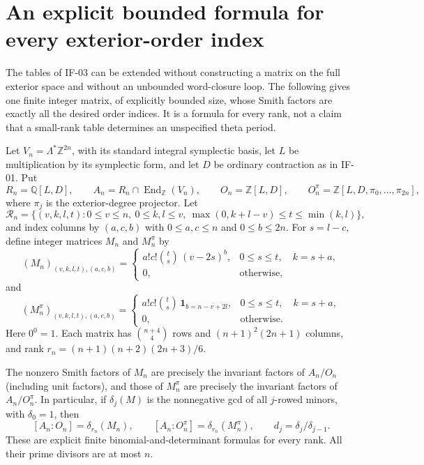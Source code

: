 \section{An explicit bounded formula for every exterior-order index}
\label{sec:bounded-indices}

The tables of IF-03 can be extended without constructing a matrix on
the full exterior space and without an unbounded word-closure loop.
The following gives one finite integer matrix, of explicitly bounded
size, whose Smith factors are exactly all the desired order indices.
It is a formula for every rank, not a claim that a small-rank table
determines an unspecified theta period.

\begin{theorem}
Let $V_n=\Lambda^*\mathbb Z^{2n}$, with its standard integral
symplectic basis, let $L$ be multiplication by its symplectic form,
and let $D$ be ordinary contraction as in IF-01. Put
\[
 R_n=\mathbb Q[L,D],\qquad
 A_n=R_n\cap\operatorname{End}_{\mathbb Z}(V_n),\qquad
 O_n=\mathbb Z[L,D],\qquad
 O_n^\pi=\mathbb Z[L,D,\pi_0,\ldots,\pi_{2n}],
\]
where $\pi_j$ is the exterior-degree projector. Let
\[
 \mathcal R_n=\{(v,k,l,t):0\le v\le n,\ 0\le k,l\le v,
 \ \max(0,k+l-v)\le t\le\min(k,l)\},
\]
and index columns by $(a,c,b)$ with $0\le a,c\le n$ and
$0\le b\le2n$. For $s=l-c$, define integer matrices $M_n$ and
$M_n^\pi$ by
\[
 (M_n)_{(v,k,l,t),(a,c,b)}=
 \begin{cases}
 a!c!\binom ts\,(v-2s)^b,&0\le s\le t,\quad k=s+a,\\
 0,&\text{otherwise},
 \end{cases}                                      \tag{SN-15a}
\]
and
\[
 (M_n^\pi)_{(v,k,l,t),(a,c,b)}=
 \begin{cases}
 a!c!\binom ts\,\mathbf1_{b=n-v+2l},
       &0\le s\le t,\quad k=s+a,\\
 0,&\text{otherwise}.
 \end{cases}                                      \tag{SN-15b}
\]
Here $0^0=1$. Each matrix has $\binom{n+4}{4}$ rows and
$(n+1)^2(2n+1)$ columns, and rank
$r_n=(n+1)(n+2)(2n+3)/6$.

The nonzero Smith factors of $M_n$ are precisely the invariant
factors of $A_n/O_n$ (including unit factors), and those of
$M_n^\pi$ are precisely the invariant factors of $A_n/O_n^\pi$.
In particular, if $\delta_j(M)$ is the nonnegative gcd of all
$j$-rowed minors, with $\delta_0=1$, then
\[
 [A_n:O_n]=\delta_{r_n}(M_n),\qquad
 [A_n:O_n^\pi]=\delta_{r_n}(M_n^\pi),\qquad
 d_j=\delta_j/\delta_{j-1}.                         \tag{SN-15c}
\]
These are explicit finite binomial-and-determinant formulas for
every rank. All their prime divisors are at most $n$.
\end{theorem}

